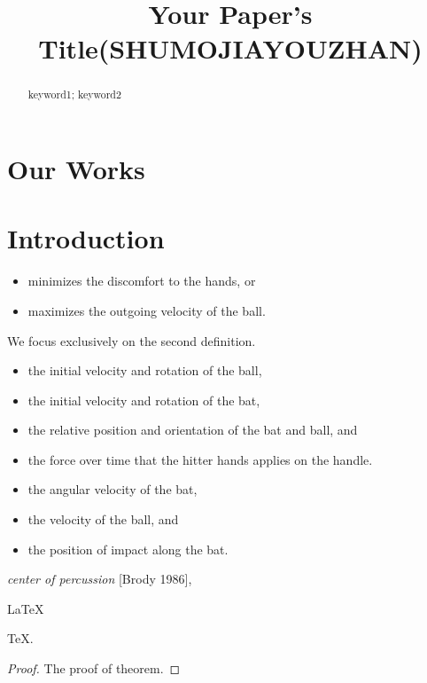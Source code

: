 \documentclass{mcmthesis}
\title{Your Paper's Title(SHUMOJIAYOUZHAN)}
\begin{document}
\begin{abstract}
\lipsum[1]

\begin{keywords}
keyword1; keyword2
\end{keywords}
\end{abstract}
\maketitle

\tableofcontents

\section*{Our Works}
\lipsum[2]

\section{Introduction}
\lipsum[2]
\begin{itemize}
\item minimizes the discomfort to the hands, or 
\item maximizes the outgoing velocity of the ball.
\end{itemize}
We focus exclusively on the second definition.
\begin{itemize}
\item the initial velocity and rotation of the ball,
\item the initial velocity and rotation of the bat,
\item the relative position and orientation of the bat and ball, and
\item the force over time that the hitter hands applies on the handle.
\end{itemize}
\lipsum[3]
\begin{itemize}
\item the angular velocity of the bat,
\item the velocity of the ball, and
\item the position of impact along the bat.
\end{itemize}
\lipsum[4]
\emph{center of percussion} [Brody 1986], \lipsum[5]
\begin{Theorem} \label{thm:latex}
\LaTeX
\end{Theorem}
\begin{Lemma} \label{thm:tex}
\TeX .
\end{Lemma}
\begin{proof}
The proof of theorem.
\end{proof}
\end{document}
